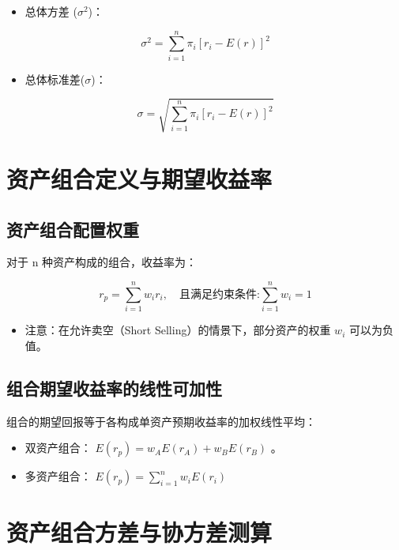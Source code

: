 \documentclass[lang=cn,10pt,color=blue]{elegantbook}
\begin{document}
\begin{itemize}
  \item 总体方差 ($\sigma^2$)：
\end{itemize}

$$
\sigma^ {2} = \sum_ {i = 1} ^ {n} \pi_ {i} [ r _ {i} - E (r) ] ^ {2}
$$

\begin{itemize}
  \item 总体标准差($\sigma$)：
\end{itemize}

$$
\sigma = \sqrt {\sum_ {i = 1} ^ {n} \pi_ {i} [ r _ {i} - E (r) ] ^ {2}}
$$

\section{资产组合定义与期望收益率}

\subsection{资产组合配置权重}

对于 n 种资产构成的组合，收益率为： 

$$
r _ {p} = \sum_ {i = 1} ^ {n} w _ {i} r _ {i}, \quad \text {且满足约束条件:} \sum_ {i = 1} ^ {n} w _ {i} = 1
$$

\begin{itemize}
  \item 注意：在允许卖空（Short Selling）的情景下，部分资产的权重 $w _ { i }$ 可以为负值。
\end{itemize}

\subsection{组合期望收益率的线性可加性}

组合的期望回报等于各构成单资产预期收益率的加权线性平均： 

\begin{itemize}
  \item 双资产组合： $E ( r _ { p } ) = w _ { A } E ( r _ { A } ) + w _ { B } E ( r _ { B } )$ 。

  \item 多资产组合： $\displaystyle E ( r _ { p } ) = \sum _ { i = 1 } ^ { n } w _ { i } E ( r _ { i } )$
\end{itemize}

\section{资产组合方差与协方差测算}
\end{document}
